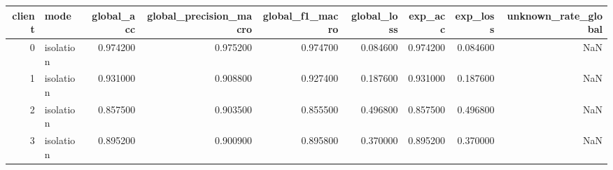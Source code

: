 \begin{tabular}{rlrrrrrrr}
\toprule
client & mode & global_acc & global_precision_macro & global_f1_macro & global_loss & exp_acc & exp_loss & unknown_rate_global \\
\midrule
0 & isolation & 0.974200 & 0.975200 & 0.974700 & 0.084600 & 0.974200 & 0.084600 & NaN \\
1 & isolation & 0.931000 & 0.908800 & 0.927400 & 0.187600 & 0.931000 & 0.187600 & NaN \\
2 & isolation & 0.857500 & 0.903500 & 0.855500 & 0.496800 & 0.857500 & 0.496800 & NaN \\
3 & isolation & 0.895200 & 0.900900 & 0.895800 & 0.370000 & 0.895200 & 0.370000 & NaN \\
\bottomrule
\end{tabular}
